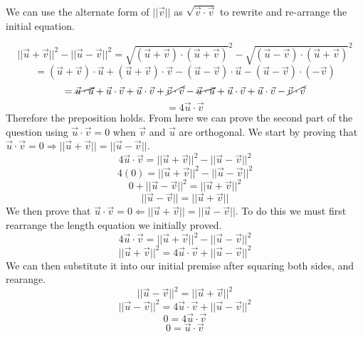 \documentclass{article}
\begin{document}
We can use the alternate form of $||\vec{v}||$ as $\sqrt{\vec{v}\cdot\vec{v}}$ to rewrite and re-arrange the initial equation.

\[||\vec{u}+\vec{v}||^{2}-||\vec{u}-\vec{v}||^{2}=\sqrt{(\vec{u}+\vec{v})\cdot(\vec{u}+\vec{v})}^{2}-\sqrt{(\vec{u}-\vec{v})\cdot(\vec{u}+\vec{v})}^{2}\]
\[= (\vec{u}+\vec{v})\cdot \vec{u} + (\vec{u}+\vec{v})\cdot \vec{v} - (\vec{u}-\vec{v}) \cdot \vec{u} - (\vec{u} - \vec{v}) \cdot (-\vec{v})\]
\[= \cancel{\vec{u}\cdot\vec{u}} + \vec{u}\cdot\vec{v} + \vec{u}\cdot\vec{v} +\cancel{\vec{v}\cdot\vec{v}} - \cancel{\vec{u}\cdot \vec{u}} + \vec{u} \cdot \vec{v} + \vec{u} \cdot \vec{v} - \cancel{\vec{v}\cdot \vec{v}}\]
\[=4\vec{u}\cdot\vec{v}\]
Therefore the preposition holds. From here we can prove the second part of the question using $\vec{u}\cdot\vec{v} = 0$ when $\vec{v}$ and $\vec{u}$ are orthogonal. We start by proving that $\vec{u}\cdot\vec{v}=0\Rightarrow||\vec{u}+\vec{v}|| = ||\vec{u}-\vec{v}||$.
\[4\vec{u}\cdot\vec{v} = ||\vec{u} + \vec{v}||^{2} - ||\vec{u} - \vec{v}||^{2}\]
\[4(0) = ||\vec{u} + \vec{v}||^{2} - ||\vec{u} - \vec{v}||^{2}\]
\[0  + ||\vec{u} - \vec{v}||^{2}= ||\vec{u} + \vec{v}||^{2}\]
\[||\vec{u} - \vec{v}||= ||\vec{u} + \vec{v}||\]
We then prove that $\vec{u}\cdot\vec{v}=0\Leftarrow||\vec{u}+\vec{v}|| = ||\vec{u}-\vec{v}||$. To do this we must first rearrange the length equation we initially proved.
\[4\vec{u}\cdot\vec{v} = ||\vec{u}+\vec{v}||^{2}-||\vec{u}-\vec{v}||^{2}\]
\[||\vec{u}+\vec{v}||^{2} = 4\vec{u}\cdot\vec{v} + ||\vec{u}-\vec{v}||^{2}\]
We can then substitute it into our initial premise after squaring both sides, and rearange.
\[||\vec{u}-\vec{v}||^{2}=||\vec{u}+\vec{v}||^{2}\]
\[||\vec{u}-\vec{v}||^{2}=4\vec{u}\cdot\vec{v}+||\vec{u}-\vec{v}||^{2}\]
\[0=4\vec{u}\cdot\vec{v}\]
\[0=\vec{u}\cdot\vec{v}\]
\end{document}

